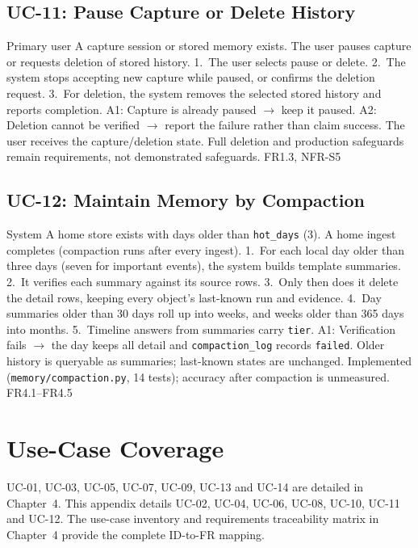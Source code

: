 \subsection{UC-11: Pause Capture or Delete History}
{Primary user}
{A capture session or stored memory exists.}
{The user pauses capture or requests deletion of stored history.}
{1.~The user selects pause or delete. 2.~The system stops accepting new capture while paused, or confirms the deletion request. 3.~For deletion, the system removes the selected stored history and reports completion.}
{A1: Capture is already paused $\rightarrow$ keep it paused. A2: Deletion cannot be verified $\rightarrow$ report the failure rather than claim success.}
{The user receives the capture/deletion state. Full deletion and production safeguards remain requirements, not demonstrated safeguards.}
{FR1.3, NFR-S5}

\subsection{UC-12: Maintain Memory by Compaction}
{System}
{A home store exists with days older than \texttt{hot\_days} (3).}
{A home ingest completes (compaction runs after every ingest).}
{1.~For each local day older than three days (seven for important events), the system builds template summaries. 2.~It verifies each summary against its source rows. 3.~Only then does it delete the detail rows, keeping every object's last-known run and evidence. 4.~Day summaries older than 30 days roll up into weeks, and weeks older than 365 days into months. 5.~Timeline answers from summaries carry \texttt{tier}.}
{A1: Verification fails $\rightarrow$ the day keeps all detail and \texttt{compaction\_log} records \texttt{failed}.}
{Older history is queryable as summaries; last-known states are unchanged. Implemented (\texttt{memory/compaction.py}, 14 tests); accuracy after compaction is unmeasured.}
{FR4.1--FR4.5}

\section{Use-Case Coverage}
UC-01, UC-03, UC-05, UC-07, UC-09, UC-13 and UC-14 are detailed in Chapter~4. This appendix details UC-02,
UC-04, UC-06, UC-08, UC-10, UC-11 and UC-12. The use-case inventory and
requirements traceability matrix in Chapter~4 provide the complete ID-to-FR
mapping.